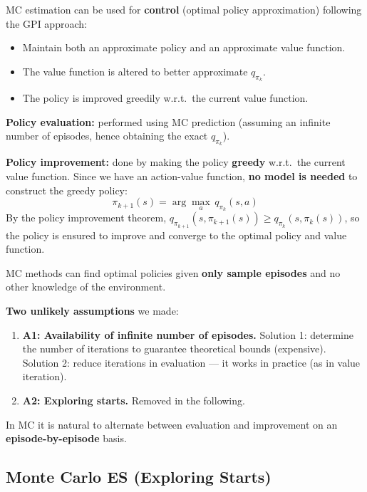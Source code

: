 \documentclass[11pt,a4paper]{article}
\theoremstyle{definition}
\theoremstyle{plain}
\theoremstyle{remark}
\begin{document}
MC estimation can be used for \textbf{control} (optimal policy approximation) following the GPI approach:
\begin{itemize}
    \item Maintain both an approximate policy and an approximate value function.
    \item The value function is altered to better approximate $q_{\pi_k}$.
    \item The policy is improved greedily w.r.t.\ the current value function.
\end{itemize}

\textbf{Policy evaluation:} performed using MC prediction (assuming an infinite number of episodes, hence obtaining the exact $q_{\pi_k}$).

\textbf{Policy improvement:} done by making the policy \textbf{greedy} w.r.t.\ the current value function. Since we have an action-value function, \textbf{no model is needed} to construct the greedy policy:
\[
    \pi_{k+1}(s) = \arg\max_a\, q_{\pi_k}(s, a)
\]
By the policy improvement theorem, $q_{\pi_{k+1}}(s, \pi_{k+1}(s)) \geq q_{\pi_k}(s, \pi_k(s))$, so the policy is ensured to improve and converge to the optimal policy and value function.

\begin{tcolorbox}[colback=blue!5!white, colframe=blue!60!black]
MC methods can find optimal policies given \textbf{only sample episodes} and no other knowledge of the environment.
\end{tcolorbox}

\textbf{Two unlikely assumptions} we made:
\begin{enumerate}
    \item \textbf{A1: Availability of infinite number of episodes.} Solution 1: determine the number of iterations to guarantee theoretical bounds (expensive). Solution 2: reduce iterations in evaluation — it works in practice (as in value iteration).
    \item \textbf{A2: Exploring starts.} Removed in the following.
\end{enumerate}
In MC it is natural to alternate between evaluation and improvement on an \textbf{episode-by-episode} basis.

\subsection{Monte Carlo ES (Exploring Starts)}
\end{document}
